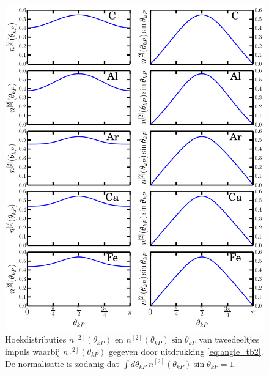 \documentclass[11pt,twoside]{book}
\begin{document}
\begin{figure}
\centering
\includegraphics[scale=0.63]{./figuren/multi_angle.png}
\caption{Hoekdistributies $n^{[2]}(\theta_{kP})$ en $n^{[2]}(\theta_{kP})\sin{\theta_{kP}}$ van tweedeeltjes impuls waarbij $n^{[2]}(\theta_{kP})$ gegeven door uitdrukking \eqref{eq:angle_tb2}. De normalisatie is zodanig dat $\int d\theta_{kP}\ n^{[2]}(\theta_{kP})\sin{\theta_{kP}} = 1$.}
\label{fig:angle}
\end{figure}
\end{document}
